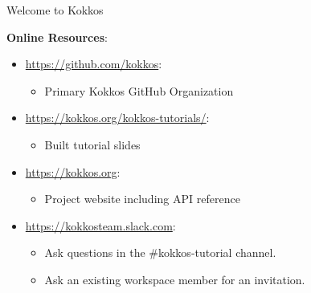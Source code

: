 \begin{frame}{Welcome to Kokkos}

\textbf{Online Resources}:

\begin{itemize}
	\item \url{https://github.com/kokkos}: 
		\begin{itemize}
			\item Primary Kokkos GitHub Organization
		\end{itemize}
	\item \url{https://kokkos.org/kokkos-tutorials/}:
		\begin{itemize}
			\item Built tutorial slides
		\end{itemize}
	\item \url{https://kokkos.org}:
		\begin{itemize}
			\item Project website including API reference
		\end{itemize}
	\item \url{https://kokkosteam.slack.com}:
		\begin{itemize}
			\item Ask questions in the \#kokkos-tutorial channel.
			\item Ask an existing workspace member for an invitation.
		\end{itemize}
\end{itemize}

\end{frame}



